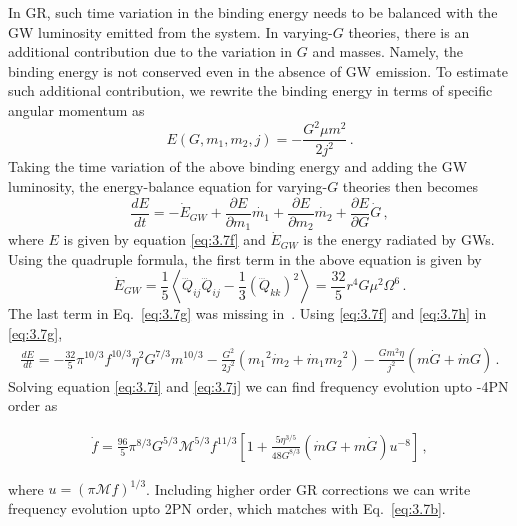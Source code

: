 \documentclass[prd,twocolumn,nofootinbib]{revtex4-1}
\begin{document}
In GR, such time variation in the binding energy needs to be balanced with the GW luminosity emitted from the system. In varying-$G$ theories, there is an additional contribution due to the variation in $G$ and masses. Namely, the binding energy is not conserved even in the absence of GW emission. To estimate such additional contribution, we rewrite the binding energy in terms of specific angular momentum as
 \begin{equation}\label{eq:3.7f}
 E(G,m_1,m_2,j)=-\frac{G^2 \mu  m^2}{2 j^2}\,.
 \end{equation}
 \hspace*{15.5pt} Taking the time variation of the above binding energy and adding the GW luminosity, the energy-balance equation for varying-$G$ theories then becomes
 \begin{equation}\label{eq:3.7g}
\frac{d E}{d t}=-\dot{E}_{GW}+\frac{\partial E}{\partial m_1}\dot{m_1}+\frac{\partial E}{\partial m_2}\dot{m_2}+\frac{\partial E}{\partial G}\dot{G}\,,
 \end{equation}
 where $E$ is given by equation \eqref{eq:3.7f} and $\dot{E}_{GW}$ is the energy radiated by GWs. Using the quadruple formula, the first term in the above equation is given by
 \begin{equation}\label{eq:3.7h}
 \dot{E}_{GW}=\frac{1}{5}\left \langle\dddot{Q}_{ij}\dddot{Q}_{ij}-\frac{1}{3}(\dddot{Q}_{kk})^2\right \rangle=\frac{32}{5} r^4 G \mu ^2 \Omega ^6\,.
 \end{equation}
 The last term in Eq.~\eqref{eq:3.7g} was missing in~\cite{Yunes:2009bv}.
 Using \eqref{eq:3.7f} and \eqref{eq:3.7h} in \eqref{eq:3.7g},
 \begin{align}\label{eq:3.7i}
\frac{d E}{d t}=- \frac{32}{5} \pi ^{10/3} f^{10/3} \eta ^2 G^{7/3} m^{10/3}-\frac{G^2}{2j^2}({m_1}^2\dot{m}_2+\dot{m}_1{m_2}^2)-\frac{Gm^2\eta}{j^2}(m\dot{G}+\dot{m}G)\,.
 \end{align}
 \hspace{15.5pt}Solving equation \eqref{eq:3.7i} and \eqref{eq:3.7j} we can find frequency evolution upto -4PN order as
 
 \begin{align} 
 \dot{f}=\frac{96}{5}\pi^{8/3}G^{5/3}\mathcal{M}^{5/3}f^{11/3}[1+\frac{5\eta^{3/5}}{48 G^{8/3}}(\dot{m}G+m\dot{G})u^{-8}]\,,
 \end{align} 
 
 
 where $u=(\pi \mathcal{M}f)^{1/3}$. Including higher order GR corrections we can write frequency evolution upto 2PN order, which matches with Eq.~\eqref{eq:3.7b}.
 
\end{document}
